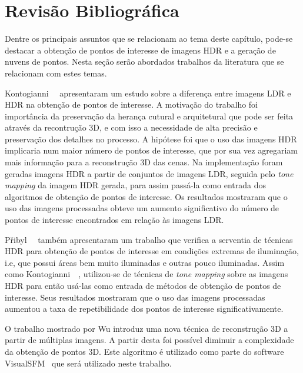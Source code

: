 \section{Revisão Bibliográfica} \label{revisaoPontos}

Dentre os principais assuntos que se relacionam ao tema deste capítulo, pode-se destacar a obtenção de pontos de interesse de imagens HDR e a geração de nuvens de pontos. Nesta seção serão abordados trabalhos da literatura que se relacionam com estes temas.

Kontogianni~\etal~\cite{hdr3d} apresentaram um estudo sobre a diferença entre imagens LDR e HDR na obtenção de pontos de interesse. A motivação do trabalho foi importância da preservação da herança cutural e arquitetural que pode ser feita através da recontrução 3D, e com isso a necessidade de alta precisão e preservação dos detalhes no processo. A hipótese foi que o uso das imagens HDR implicaria num maior número de pontos de interesse, que por sua vez agregariam mais informação para a reconstrução 3D das cenas. Na implementação foram geradas imagens HDR a partir de conjuntos de imagens LDR, seguida pelo \textit{tone mapping} da imagem HDR gerada, para assim passá-la como entrada dos algoritmos de obtenção de pontos de interesse. Os resultados mostraram que o uso das imagens processadas obteve um aumento significativo do número de pontos de interesse encontrados em relação às imagens LDR.

P\v{r}ibyl~\etal~\cite{hdr3d2} também apresentaram um trabalho que verifica a serventia de técnicas HDR para obtenção de pontos de interesse em condições extremas de iluminação, i.e, que possui áreas bem muito iluminadas e outras pouco iluminadas. Assim como Kontogianni~\etal~\cite{hdr3d}, utilizou-se de técnicas de \textit{tone mapping} sobre as imagens HDR para então usá-las como entrada de métodos de obtenção de pontos de interesse. Seus resultados mostraram que o uso das imagens processadas aumentou a taxa de repetibilidade dos pontos de interesse significativamente.

%
O trabalho mostrado por Wu \cite{visualSFMBA} introduz uma nova técnica de reconstrução 3D a partir de múltiplas imagens. A partir desta foi possível diminuir a complexidade da obtenção de pontos 3D. Este algoritmo é utilizado como parte do software VisualSFM~\cite{visualSFM} que será utilizado neste trabalho.

